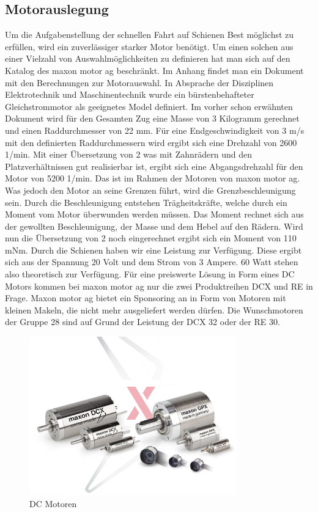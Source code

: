 \documentclass[../../main.tex]{subfiles}
\begin{document}
    \subsection{Motorauslegung}
          Um die Aufgabenstellung der schnellen Fahrt auf Schienen Best möglichst zu erfüllen, wird ein zuverlässiger starker Motor benötigt. Um einen solchen aus einer Vielzahl von Auswahlmöglichkeiten zu definieren hat man sich auf den Katalog des maxon motor ag beschränkt. Im Anhang findet man ein Dokument mit den Berechnungen zur Motorauswahl. In Absprache der Disziplinen Elektrotechnik und Maschinentechnik wurde ein bürstenbehafteter Gleichstrommotor als geeignetes Model definiert. Im vorher schon erwähnten Dokument wird für den Gesamten Zug eine Masse von 3 Kilogramm gerechnet und einen Raddurchmesser von 22 mm. Für eine Endgeschwindigkeit von 3 m/s mit den definierten Raddurchmessern wird ergibt sich eine Drehzahl von 2600 1/min. Mit einer Übersetzung von 2 was mit Zahnrädern und den Platzverhältnissen gut realisierbar ist, ergibt sich eine Abgangsdrehzahl für den Motor von 5200 1/min. Das ist im Rahmen der Motoren von maxon motor ag. Was jedoch den Motor an seine Grenzen führt, wird die Grenzbeschleunigung sein. Durch die Beschleunigung entstehen Trägheitskräfte, welche durch ein Moment vom Motor überwunden werden müssen. Das Moment rechnet sich aus der gewollten Beschleunigung, der Masse und dem Hebel auf den Rädern. Wird nun die Übersetzung von 2 noch eingerechnet ergibt sich ein Moment von 110 mNm. Durch die Schienen haben wir eine Leistung zur Verfügung. Diese ergibt sich aus der Spannung 20 Volt und dem Strom von 3 Ampere. 60 Watt stehen also theoretisch zur Verfügung. Für eine preiswerte Lösung in Form eines DC Motors kommen bei maxon motor ag nur die zwei Produktreihen DCX und RE in Frage. Maxon motor ag bietet ein Sponsoring an in Form von Motoren mit kleinen Makeln, die nicht mehr ausgeliefert werden dürfen. Die Wunschmotoren der Gruppe 28 sind auf Grund der Leistung der DCX 32 oder der RE 30.

    \begin{figure}[H]
        \centering
        \includegraphics[width=0.8\textwidth]{../../images/Kran/Motors.JPG}
        \caption {DC Motoren}
    \end{figure}


    
\end{document}
